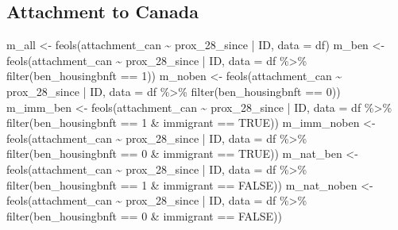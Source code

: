 \documentclass[
  letterpaper,
  DIV=11,
  numbers=noendperiod]{scrartcl}
\newenvironment{Shaded}{\begin{snugshade}}{\end{snugshade}}
\newcommand{\AttributeTok}[1]{\textcolor[rgb]{0.40,0.45,0.13}{#1}}
\newcommand{\ConstantTok}[1]{\textcolor[rgb]{0.56,0.35,0.01}{#1}}
\newcommand{\DecValTok}[1]{\textcolor[rgb]{0.68,0.00,0.00}{#1}}
\newcommand{\FunctionTok}[1]{\textcolor[rgb]{0.28,0.35,0.67}{#1}}
\newcommand{\NormalTok}[1]{\textcolor[rgb]{0.00,0.23,0.31}{#1}}
\newcommand{\OtherTok}[1]{\textcolor[rgb]{0.00,0.23,0.31}{#1}}
\newcommand{\SpecialCharTok}[1]{\textcolor[rgb]{0.37,0.37,0.37}{#1}}
\begin{document}
\hypertarget{attachment-to-canada-1}{%
\subsection{Attachment to Canada}\label{attachment-to-canada-1}}

\begin{Shaded}
\begin{Highlighting}[]
\NormalTok{m\_all }\OtherTok{\textless{}{-}} \FunctionTok{feols}\NormalTok{(attachment\_can }\SpecialCharTok{\textasciitilde{}}\NormalTok{ prox\_28\_since }\SpecialCharTok{|}\NormalTok{ ID, }\AttributeTok{data =}\NormalTok{ df)}
\NormalTok{m\_ben }\OtherTok{\textless{}{-}} \FunctionTok{feols}\NormalTok{(attachment\_can }\SpecialCharTok{\textasciitilde{}}\NormalTok{ prox\_28\_since }\SpecialCharTok{|}\NormalTok{ ID,}
               \AttributeTok{data =}\NormalTok{ df }\SpecialCharTok{\%\textgreater{}\%} \FunctionTok{filter}\NormalTok{(ben\_housingbnft }\SpecialCharTok{==} \DecValTok{1}\NormalTok{))}
\NormalTok{m\_noben }\OtherTok{\textless{}{-}} \FunctionTok{feols}\NormalTok{(attachment\_can }\SpecialCharTok{\textasciitilde{}}\NormalTok{ prox\_28\_since }\SpecialCharTok{|}\NormalTok{ ID,}
                 \AttributeTok{data =}\NormalTok{ df }\SpecialCharTok{\%\textgreater{}\%} \FunctionTok{filter}\NormalTok{(ben\_housingbnft }\SpecialCharTok{==} \DecValTok{0}\NormalTok{))}
\NormalTok{m\_imm\_ben }\OtherTok{\textless{}{-}} \FunctionTok{feols}\NormalTok{(attachment\_can }\SpecialCharTok{\textasciitilde{}}\NormalTok{ prox\_28\_since }\SpecialCharTok{|}\NormalTok{ ID,}
                   \AttributeTok{data =}\NormalTok{ df }\SpecialCharTok{\%\textgreater{}\%} \FunctionTok{filter}\NormalTok{(ben\_housingbnft }\SpecialCharTok{==} \DecValTok{1} \SpecialCharTok{\&}\NormalTok{ immigrant }\SpecialCharTok{==} \ConstantTok{TRUE}\NormalTok{))}
\NormalTok{m\_imm\_noben }\OtherTok{\textless{}{-}} \FunctionTok{feols}\NormalTok{(attachment\_can }\SpecialCharTok{\textasciitilde{}}\NormalTok{ prox\_28\_since }\SpecialCharTok{|}\NormalTok{ ID,}
                     \AttributeTok{data =}\NormalTok{ df }\SpecialCharTok{\%\textgreater{}\%} \FunctionTok{filter}\NormalTok{(ben\_housingbnft }\SpecialCharTok{==} \DecValTok{0} \SpecialCharTok{\&}\NormalTok{ immigrant }\SpecialCharTok{==} \ConstantTok{TRUE}\NormalTok{))}
\NormalTok{m\_nat\_ben }\OtherTok{\textless{}{-}} \FunctionTok{feols}\NormalTok{(attachment\_can }\SpecialCharTok{\textasciitilde{}}\NormalTok{ prox\_28\_since }\SpecialCharTok{|}\NormalTok{ ID,}
                   \AttributeTok{data =}\NormalTok{ df }\SpecialCharTok{\%\textgreater{}\%} \FunctionTok{filter}\NormalTok{(ben\_housingbnft }\SpecialCharTok{==} \DecValTok{1} \SpecialCharTok{\&}\NormalTok{ immigrant }\SpecialCharTok{==} \ConstantTok{FALSE}\NormalTok{))}
\NormalTok{m\_nat\_noben }\OtherTok{\textless{}{-}} \FunctionTok{feols}\NormalTok{(attachment\_can }\SpecialCharTok{\textasciitilde{}}\NormalTok{ prox\_28\_since }\SpecialCharTok{|}\NormalTok{ ID,}
                     \AttributeTok{data =}\NormalTok{ df }\SpecialCharTok{\%\textgreater{}\%} \FunctionTok{filter}\NormalTok{(ben\_housingbnft }\SpecialCharTok{==} \DecValTok{0} \SpecialCharTok{\&}\NormalTok{ immigrant }\SpecialCharTok{==} \ConstantTok{FALSE}\NormalTok{))}


\end{Highlighting}
\end{Shaded}
\end{document}
